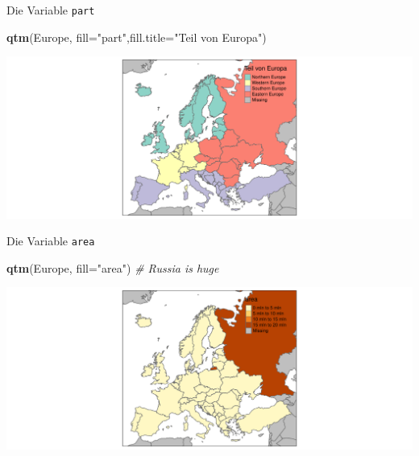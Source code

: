 \documentclass[ignorenonframetext,]{beamer}
\newenvironment{Shaded}{\begin{snugshade}}{\end{snugshade}}
\newcommand{\KeywordTok}[1]{\textcolor[rgb]{0.13,0.29,0.53}{\textbf{#1}}}
\newcommand{\DataTypeTok}[1]{\textcolor[rgb]{0.13,0.29,0.53}{#1}}
\newcommand{\StringTok}[1]{\textcolor[rgb]{0.31,0.60,0.02}{#1}}
\newcommand{\CommentTok}[1]{\textcolor[rgb]{0.56,0.35,0.01}{\textit{#1}}}
\newcommand{\NormalTok}[1]{#1}
\begin{document}
\begin{frame}[fragile]{Die Variable \texttt{part}}

\begin{Shaded}
\begin{Highlighting}[]
\KeywordTok{qtm}\NormalTok{(Europe, }\DataTypeTok{fill=}\StringTok{"part"}\NormalTok{,}\DataTypeTok{fill.title=}\StringTok{"Teil von Europa"}\NormalTok{)}
\end{Highlighting}
\end{Shaded}

\includegraphics{tmap_files/figure-beamer/unnamed-chunk-16-1.pdf}

\end{frame}

\begin{frame}[fragile]{Die Variable \texttt{area}}

\begin{Shaded}
\begin{Highlighting}[]
\KeywordTok{qtm}\NormalTok{(Europe, }\DataTypeTok{fill=}\StringTok{"area"}\NormalTok{) }\CommentTok{# Russia is huge}
\end{Highlighting}
\end{Shaded}

\includegraphics{tmap_files/figure-beamer/unnamed-chunk-17-1.pdf}

\end{frame}
\end{document}
